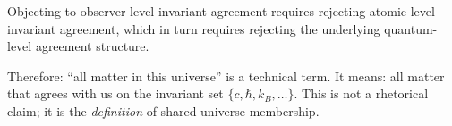 \begin{corollary}\label{cor:observer-rejection-cascade}
Objecting to observer-level invariant agreement requires rejecting atomic-level
invariant agreement, which in turn requires rejecting the underlying quantum-level agreement structure.
\end{corollary}

Therefore: ``all matter in this universe'' is a technical term. It means:
all matter that agrees with us on the invariant set $\{c, \hbar, k_B, \ldots\}$.
This is not a rhetorical claim; it is the \emph{definition} of shared universe membership.
